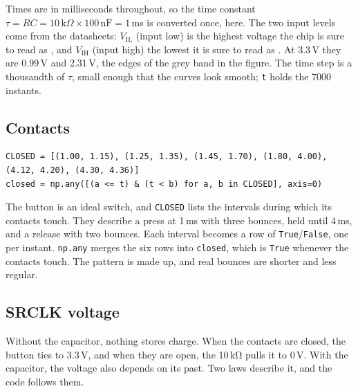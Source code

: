 \documentclass[11pt,a4paper]{article}
\begin{document}
Times are in milliseconds throughout, so the time constant $\tau = RC = 10\,\mathrm{k}\Omega \times 100\,\mathrm{nF} = 1$\,ms is converted once, here. The two input levels come from the  datasheets: $V_\mathrm{IL}$ (input low) is the highest voltage the chip is sure to read as , and $V_\mathrm{IH}$ (input high) the lowest it is sure to read as . At 3.3\,V they are 0.99\,V and 2.31\,V, the edges of the grey band in the figure. The time step is a thousandth of $\tau$, small enough that the curves look smooth; \texttt{t} holds the 7000 instants.

\subsection*{Contacts}

\begin{verbatim}
CLOSED = [(1.00, 1.15), (1.25, 1.35), (1.45, 1.70), (1.80, 4.00), (4.12, 4.20), (4.30, 4.36)]
closed = np.any([(a <= t) & (t < b) for a, b in CLOSED], axis=0)
\end{verbatim}

The button is an ideal switch, and \texttt{CLOSED} lists the intervals during which its contacts touch. They describe a press at 1\,ms with three bounces, held until 4\,ms, and a release with two bounces. Each interval becomes a row of \texttt{True}/\texttt{False}, one per instant. \texttt{np.any} merges the six rows into \texttt{closed}, which is \texttt{True} whenever the contacts touch. The pattern is made up, and real bounces are shorter and less regular.

\subsection*{SRCLK voltage}

Without the capacitor, nothing stores charge. When the contacts are closed, the button ties  to 3.3\,V, and when they are open, the 10\,kΩ pulls it to 0\,V. With the capacitor, the voltage also depends on its past. Two laws describe it, and the code follows them.
\end{document}
